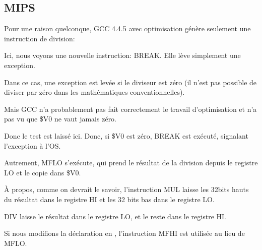 ﻿\subsection{MIPS}

Pour une raison quelconque, GCC 4.4.5 avec optimisation génère seulement une instruction
de division:



Ici, nous voyons une nouvelle instruction: BREAK. Elle lève simplement une exception.

Dans ce cas, une exception est levée si le diviseur est zéro (il n'est pas possible
de diviser par zéro dans les mathématiques conventionnelles).

Mais GCC n'a probablement pas fait correctement le travail d'optimisation et n'a
pas vu que \$V0 ne vaut jamais zéro.

Donc le test est laissé ici.
Donc, si \$V0 est zéro, BREAK est exécuté, signalant l'exception à l'\ac{OS}.

Autrement, MFLO s'exécute, qui prend le résultat de la division depuis le registre
LO et le copie dans \$V0.

À propos, comme on devrait le savoir, l'instruction MUL laisse les 32bits hauts du
résultat dans le registre HI et les 32 bits bas dans le registre LO.

DIV laisse le résultat dans le registre LO, et le reste dans le registre HI.

Si nous modifions la déclaration en ,
l'instruction MFHI est utilisée au lieu de MFLO.
